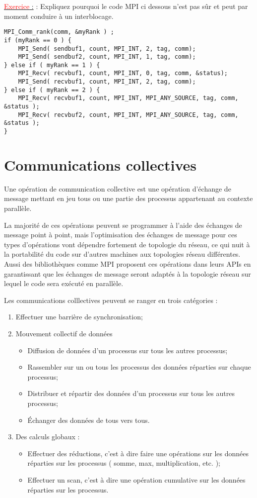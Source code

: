 \documentclass[fleqn,11pt]{article}
\begin{document}
\underline{\textcolor{red}{Exercice} :} : Expliquez pourquoi le code MPI ci dessous n'est pas sûr et peut par moment
conduire à un interblocage.

\begin{lstlisting}
MPI_Comm_rank(comm, &myRank ) ;
if (myRank == 0 ) {
    MPI_Send( sendbuf1, count, MPI_INT, 2, tag, comm);
    MPI_Send( sendbuf2, count, MPI_INT, 1, tag, comm);
} else if ( myRank == 1 ) {
    MPI_Recv( recvbuf1, count, MPI_INT, 0, tag, comm, &status);
    MPI_Send( recvbuf1, count, MPI_INT, 2, tag, comm);
} else if ( myRank == 2 ) {
    MPI_Recv( recvbuf1, count, MPI_INT, MPI_ANY_SOURCE, tag, comm, &status );
    MPI_Recv( recvbuf2, count, MPI_INT, MPI_ANY_SOURCE, tag, comm, &status );
}
\end{lstlisting}

\section{Communications collectives}

Une opération de communication collective est une opération d'échange de message
mettant en jeu tous ou une partie des processus appartenant au contexte
parallèle.

La majorité de ces opérations peuvent se programmer à l'aide des échanges de
message point à point, mais l'optimisation des échanges de message pour ces
types d'opérations vont dépendre fortement de topologie du réseau, ce qui nuit
à la portabilité du code sur d'autres machines aux topologies réseau différentes. 
Aussi des bibliothèques comme MPI proposent ces opérations dans leurs APIs en garantissant
que les échanges de message seront adaptés à la topologie réseau sur lequel le code sera
exécuté en parallèle.

Les communications colllectives peuvent se ranger en trois catégories :
\begin{enumerate}
\item Effectuer une barrière de synchronisation;
\item Mouvement collectif de données
  \begin{itemize}
  \item Diffusion de données d'un processus sur tous les autres processus;
  \item Rassembler sur un ou tous les processus des données réparties sur
  chaque processus;
  \item Distribuer et répartir des données d'un processus sur tous les autres 
  processus;
  \item \'Echanger des données de tous vers tous.
  \end{itemize}
\item Des calculs globaux :
  \begin{itemize}
  \item Effectuer des réductions, c'est à dire faire une opérations sur les données réparties
  sur les processus ( somme, max, multiplication, etc. );
  \item Effectuer un scan, c'est à dire une opération cumulative sur les données réparties
  sur les processus.
  \end{itemize}
\end{enumerate}
\end{document}
